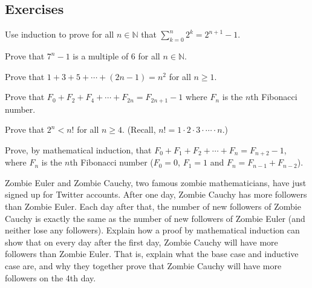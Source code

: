 \documentclass[10pt,]{book}
\theoremstyle{plain}
\theoremstyle{definition}
\theoremstyle{definition}
\theoremstyle{definition}
\theoremstyle{definition}
\numberwithin{equation}{chapter}
\def\d{\displaystyle}
\def\N{\mathbb N}
\newcommand{\lt}{<}
\begin{document}
\subsection*{Exercises}\label{exercises_seq-induction}
\begin{divisionexercise}{1}\hypertarget{exercise-256}{}
\hypertarget{p-2148}{}%
Use induction to prove for all \(n \in \N\) that \(\d\sum_{k=0}^n 2^k = 2^{n+1} - 1\).%
\end{divisionexercise}%
\begin{divisionexercise}{2}\hypertarget{exercise-257}{}
\hypertarget{p-2151}{}%
Prove that \(7^n - 1\) is a multiple of 6 for all \(n \in \N\).%
\end{divisionexercise}%
\begin{divisionexercise}{3}\hypertarget{exercise-258}{}
\hypertarget{p-2154}{}%
Prove that \(1 + 3 + 5 + \cdots + (2n-1) = n^2\) for all \(n \ge 1\).%
\end{divisionexercise}%
\begin{divisionexercise}{4}\hypertarget{exercise-259}{}
\hypertarget{p-2157}{}%
Prove that \(F_0 + F_2 + F_4 + \cdots + F_{2n} = F_{2n+1} - 1\) where \(F_n\) is the \(n\)th Fibonacci number.%
\end{divisionexercise}%
\begin{divisionexercise}{5}\hypertarget{exercise-260}{}
\hypertarget{p-2160}{}%
Prove that \(2^n \lt  n!\) for all \(n \ge 4\). (Recall, \(n! = 1\cdot 2 \cdot 3 \cdot \cdots\cdot n\).)%
\end{divisionexercise}%
\begin{divisionexercise}{6}\hypertarget{exercise-261}{}
\hypertarget{p-2163}{}%
Prove, by mathematical induction, that \(F_0 + F_1 + F_2 + \cdots + F_{n} = F_{n+2} - 1\), where \(F_n\) is the \(n\)th Fibonacci number (\(F_0 = 0\), \(F_1 = 1\) and \(F_n = F_{n-1} + F_{n-2}\)).%
\end{divisionexercise}%
\begin{divisionexercise}{7}\hypertarget{exercise-262}{}
\hypertarget{p-2171}{}%
Zombie Euler and Zombie Cauchy, two famous zombie mathematicians, have just signed up for Twitter accounts. After one day, Zombie Cauchy has more followers than Zombie Euler. Each day after that, the number of new followers of Zombie Cauchy is exactly the same as the number of new followers of Zombie Euler (and neither lose any followers). Explain how a proof by mathematical induction can show that on every day after the first day, Zombie Cauchy will have more followers than Zombie Euler. That is, explain what the base case and inductive case are, and why they together prove that Zombie Cauchy will have more followers on the 4th day.%
\end{divisionexercise}%
\end{document}

